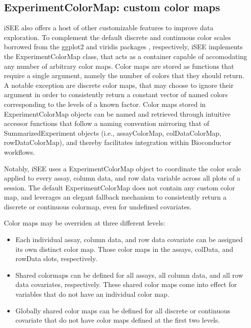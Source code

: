 \documentclass[10pt,a4paper,twocolumn]{article}
\begin{document}
\subsection*{ExperimentColorMap: custom color maps}

iSEE also offers a host of other customizable features to improve data exploration.
To complement the default discrete and continuous color scales borrowed from the ggplot2 \citep{wickham2009ggplot2} and viridis packages \citep{garnier2018viridis}, respectively, iSEE implements the ExperimentColorMap class, that acts as a container capable of accomodating any number of arbitrary color maps.
Color maps are stored as functions that require a single argument, namely the number of colors that they should return. A notable exception are discrete color maps, that may choose to ignore their argument in order to consistently return a constant vector of named colors corresponding to the levels of a known factor.
Color maps stored in ExperimentColorMap objects can be named and retrieved through intuitive accessor functions that follow a naming convention mirroring that of SummarizedExperiment objects (i.e., assayColorMap, colDataColorMap, rowDataColorMap), and thereby facilitates integration within Bioconductor workflows.

Notably, iSEE uses a ExperimentColorMap object to coordinate the color scale applied to every assay, column data, and row data variable across all plots of a session.
The default ExperimentColorMap does not contain any custom color map, and leverages an elegant fallback mechanism to consistently return a discrete or continuous colormap, even for undefined covariates.

Color maps may be overriden at three different levels:

\begin{itemize}
  \item Each individual assay, column data, and row data covariate can be assigned its own distinct color map. Those color maps in the assays, colData, and rowData slots, respectively.
  \item Shared colormaps can be defined for all assays, all column data, and all row data covariates, respectively. These shared color maps come into effect for variables that do not have an individual color map.
  \item Globally shared color maps can be defined for all discrete or continuous covariate that do not have color maps defined at the first two levels.
\end{itemize}
\end{document}
